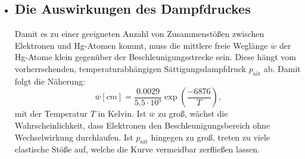 \begin{itemize}
\item\subsection{Die Auswirkungen des Dampfdruckes}
Damit es zu einer geeigneten Anzahl von Zusammenstößen zwischen Elektronen und Hg-Atomen
kommt, muss die mittlere freie Weglänge $\overline{w}$ der Hg-Atome klein gegenüber
der Beschleunigungsstrecke sein. Diese hängt vom vorherrschenden, temperaturabhängigen
Sättigungsdampfdruck $p_\text{sät}$ ab. Damit folgt
die Näherung:
\begin{equation}
  \overline{w} [cm] = \frac{0.0029}{5.5 \cdot 10⁷} \exp \left(\frac{-6876}{T}\right)\text{,}\label{eq:w}
  \end{equation}
  mit der Temperatur $T$ in Kelvin. Ist $\overline{w}$ zu groß, wächst die Wahrscheinlichkeit,
  dass Elektronen den Beschleunigungsbereich ohne Wechselwirkung durchlaufen. Ist
  $p_\text{sät}$ hingegen zu groß, treten zu viele elastische Stöße auf, welche
  die Kurve vermeidbar zerfließen lassen.
\end{itemize}

